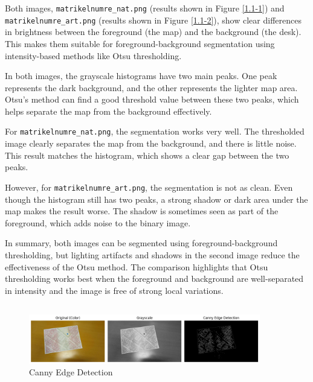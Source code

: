 \documentclass[12pt]{article}
\begin{document}
Both images, \texttt{matrikelnumre\_nat.png} (results shown in Figure \ref{1.1-1}) and \texttt{matrikelnumre\_art.png} (results shown in Figure \ref{1.1-2}), show clear differences in brightness between the foreground (the map) and the background (the desk). This makes them suitable for foreground-background segmentation using intensity-based methods like Otsu thresholding.

In both images, the grayscale histograms have two main peaks. One peak represents the dark background, and the other represents the lighter map area. Otsu's method can find a good threshold value between these two peaks, which helps separate the map from the background effectively.

For \texttt{matrikelnumre\_nat.png}, the segmentation works very well. The thresholded image clearly separates the map from the background, and there is little noise. This result matches the histogram, which shows a clear gap between the two peaks.

However, for \texttt{matrikelnumre\_art.png}, the segmentation is not as clean. Even though the histogram still has two peaks, a strong shadow or dark area under the map makes the result worse. The shadow is sometimes seen as part of the foreground, which adds noise to the binary image.

In summary, both images can be segmented using foreground-background thresholding, but lighting artifacts and shadows in the second image reduce the effectiveness of the Otsu method. The comparison highlights that Otsu thresholding works best when the foreground and background are well-separated in intensity and the image is free of strong local variations.

\subsection{}

\begin{figure}[ht]
    \centering
    \includegraphics[width=0.9\textwidth]{pics/a7-1.2.png}
    \caption{Canny Edge Detection}
    \label{1.2}
\end{figure}
\end{document}
